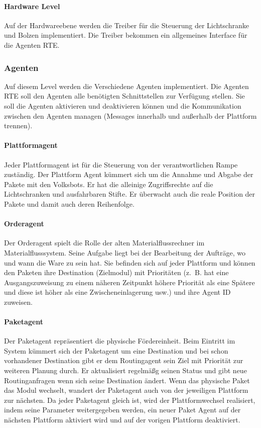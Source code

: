 \paragraph{Hardware Level}
Auf der Hardwareebene werden die Treiber für die Steuerung der Lichtschranke und Bolzen implementiert. Die Treiber bekommen ein
allgemeines Interface für die Agenten RTE.

\subsubsection{Agenten}
Auf diesem Level werden die Verschiedene Agenten implementiert.
Die Agenten RTE soll den Agenten alle benötigten Schnittstellen zur Verfügung stellen.
Sie soll die Agenten aktivieren und deaktivieren können und die Kommunikation zwischen den Agenten managen (Messages innerhalb und außerhalb der Plattform trennen)\cite[S. 26]{Stasch:Hahn}.

\paragraph{Plattformagent}
Jeder Plattformagent ist für die Steuerung von der verantwortlichen Rampe zuständig.
Der Plattform Agent kümmert sich um die Annahme und Abgabe der Pakete mit den Volksbots. Er
hat die alleinige Zugriffsrechte auf die Lichtschranken und ausfahrbaren Stifte. Er überwacht auch die reale Position 
der Pakete und damit auch deren Reihenfolge.

\paragraph{Orderagent}
Der Orderagent spielt die Rolle der alten Materialflussrechner im Materialflusssystem.
Seine Aufgabe liegt bei der Bearbeitung der Aufträge, wo und wann die Ware zu sein hat.
Sie befinden sich auf jeder Plattform und können den Paketen ihre Destination (Zielmodul) mit Prioritäten (z.~B. hat eine Ausgangszuweisung zu einem näheren Zeitpunkt höhere Priorität als eine Spätere und diese ist höher als eine Zwischeneinlagerung usw.) 
und ihre Agent ID zuweisen\cite[S. 30]{Stasch:Hahn}. 

\paragraph{Paketagent}
Der Paketagent repräsentiert die physische Fördereinheit.
Beim Eintritt im System kümmert sich der Paketagent um eine Destination und bei schon vorhandener Destination gibt er dem Routingagent sein Ziel mit Priorität zur weiteren Planung durch.
Er aktualisiert regelmäßg seinen Status und gibt neue Routinganfragen wenn sich seine Destination ändert.
Wenn das physische Paket das Modul wechselt, wandert der Paketagent auch von der jeweiligen Plattform zur nächsten. 
Da jeder Paketagent gleich ist, wird der Plattformwechsel realisiert, indem seine Parameter weitergegeben
werden, ein neuer Paket Agent auf der nächsten Plattform aktiviert wird und auf der vorigen Plattform deaktiviert\cite[S. 31]{Stasch:Hahn}.

